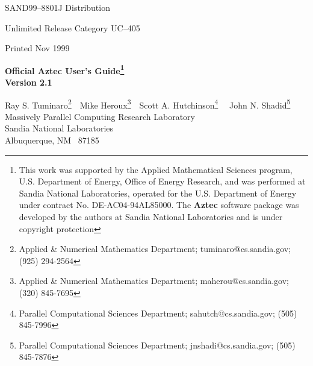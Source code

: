 \documentclass{article}[12pt]
\newcommand{\Az}  {{\bf Aztec}}
\def\draft{%
\special{!userdict begin /bop-hook{gsave
200 30 translate 65 rotate
/Times-Roman findfont 216 scalefont setfont
0 0 moveto 0.9 setgray (DRAFT) show grestore}def end}
}
\begin{document}
\large
{}


%
%
\hspace{2.22in}
SAND99--8801J
\hfill
Distribution

\hspace{2.07in}
Unlimited Release
\hfill
Category UC--405
\begin{center}
Printed Nov 1999
\end{center}

\vspace{0.8in}

\begin{center}
  {\Large{\bf Official \Az{} User's Guide\footnote{This work was supported by 
	the
        Applied Mathematical Sciences program, U.S. Department of Energy,
        Office of Energy Research, and was performed at Sandia National
        Laboratories, operated for the U.S. Department of Energy under contract
        No. DE-AC04-94AL85000. The \Az{} software package was developed by the
        authors at Sandia National Laboratories and is under copyright
        protection} \\ Version 2.1}}

\vspace*{0.4in}

Ray S. Tuminaro\footnote{Applied \& Numerical Mathematics Department;
  tuminaro@cs.sandia.gov; (925) 294-2564}
\,\,\,\,Mike Heroux\footnote{Applied \& Numerical Mathematics Department;
  maherou@cs.sandia.gov; (320) 845-7695}
\,\,\,\,Scott A. Hutchinson\footnote{Parallel Computational Sciences Department;
  sahutch@cs.sandia.gov; (505) 845-7996}
\,\,\,\, John N. Shadid\footnote{Parallel Computational Sciences Department;
  jnshadi@cs.sandia.gov; (505) 845-7876}
\\

Massively Parallel Computing Research Laboratory \\
Sandia National Laboratories \\
Albuquerque, NM \, 87185

\vspace*{.9in}

\end{center}
\end{document}
